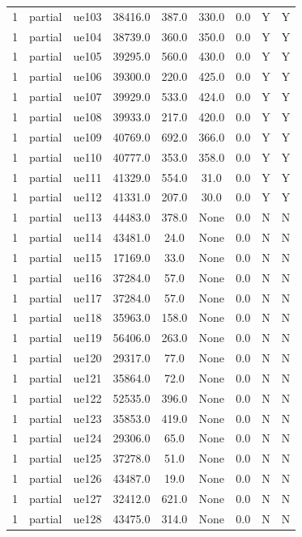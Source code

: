 \begin{table}[ht]
\begin{tabular}{|c|c|c|c|c|c|c|c|c|}
1 & partial & ue103 & 38416.0 & 387.0 & 330.0 & 0.0 & Y & Y \\
1 & partial & ue104 & 38739.0 & 360.0 & 350.0 & 0.0 & Y & Y \\
1 & partial & ue105 & 39295.0 & 560.0 & 430.0 & 0.0 & Y & Y \\
1 & partial & ue106 & 39300.0 & 220.0 & 425.0 & 0.0 & Y & Y \\
1 & partial & ue107 & 39929.0 & 533.0 & 424.0 & 0.0 & Y & Y \\
1 & partial & ue108 & 39933.0 & 217.0 & 420.0 & 0.0 & Y & Y \\
1 & partial & ue109 & 40769.0 & 692.0 & 366.0 & 0.0 & Y & Y \\
1 & partial & ue110 & 40777.0 & 353.0 & 358.0 & 0.0 & Y & Y \\
1 & partial & ue111 & 41329.0 & 554.0 & 31.0 & 0.0 & Y & Y \\
1 & partial & ue112 & 41331.0 & 207.0 & 30.0 & 0.0 & Y & Y \\
1 & partial & ue113 & 44483.0 & 378.0 & None & 0.0 & N & N \\
1 & partial & ue114 & 43481.0 & 24.0 & None & 0.0 & N & N \\
1 & partial & ue115 & 17169.0 & 33.0 & None & 0.0 & N & N \\
1 & partial & ue116 & 37284.0 & 57.0 & None & 0.0 & N & N \\
1 & partial & ue117 & 37284.0 & 57.0 & None & 0.0 & N & N \\
1 & partial & ue118 & 35963.0 & 158.0 & None & 0.0 & N & N \\
1 & partial & ue119 & 56406.0 & 263.0 & None & 0.0 & N & N \\
1 & partial & ue120 & 29317.0 & 77.0 & None & 0.0 & N & N \\
1 & partial & ue121 & 35864.0 & 72.0 & None & 0.0 & N & N \\
1 & partial & ue122 & 52535.0 & 396.0 & None & 0.0 & N & N \\
1 & partial & ue123 & 35853.0 & 419.0 & None & 0.0 & N & N \\
1 & partial & ue124 & 29306.0 & 65.0 & None & 0.0 & N & N \\
1 & partial & ue125 & 37278.0 & 51.0 & None & 0.0 & N & N \\
1 & partial & ue126 & 43487.0 & 19.0 & None & 0.0 & N & N \\
1 & partial & ue127 & 32412.0 & 621.0 & None & 0.0 & N & N \\
1 & partial & ue128 & 43475.0 & 314.0 & None & 0.0 & N & N \\

\end{tabular}
\end{table}

